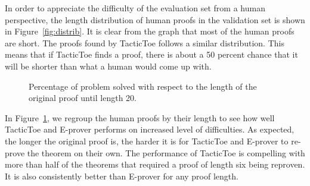 \documentclass[runningheads,a4paper,draft]{svjour3}
\def\eprover{\textsf{E-prover}\xspace}
\def\tactictoe{\textsf{TacticToe}\xspace}
\begin{document}
In order to appreciate the difficulty of the evaluation set from a human
perspective, the length distribution of human proofs in the
validation set is shown in Figure~\ref{fig:distrib}.  It is clear from the
graph that most of the human proofs are short. The proofs found by \tactictoe
follows a similar
distribution. This means that if \tactictoe finds a proof, there is about a 50
percent chance that it will be shorter than what a human would come up with.


\begin{figure}[h]
\centering
{}
\caption{\label{fig:percentage}Percentage of problem solved with respect to the
length of the
original proof until length 20.}
\end{figure}

In Figure~\ref{fig:percentage}, we regroup the human proofs by their length to
see how well \tactictoe and \eprover performs on increased level of
difficulties. As expected, the longer the original proof is, the harder it is
for \tactictoe and \eprover to re-prove the theorem on their own.
The performance of \tactictoe is compelling with more than half of the theorems
that required a proof of length six being reproven. It is also consistently
better than \eprover for any proof length.
\end{document}
